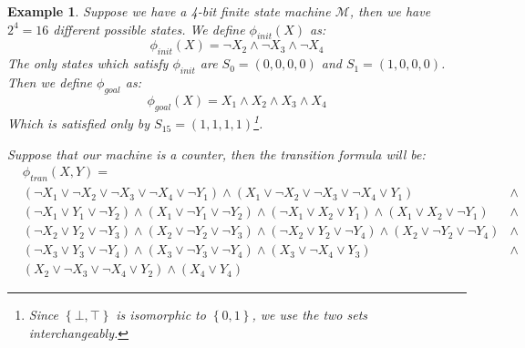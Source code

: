\documentclass{article}
\theoremstyle{example}
\newtheorem{example}{Example}
\theoremstyle{remark}
\begin{document}
\begin{example}
	Suppose we have a 4-bit finite state machine \(\mathcal{M}\), then we have \(2^4 = 16\) different
	possible states.
	We define \(\phi_{init}(X)\) as:
	\[\phi_{init}\left(X\right) = \neg X_2 \land \neg X_3 \land \neg X_4 \]
	The only states which satisfy \(\phi_{init}\) are \(S_0 = \left(0, 0, 0, 0\right)\) and
	\(S_1 = \left(1, 0, 0, 0\right)\).
	Then we define \(\phi_{goal}\) as:
	\[\phi_{goal}\left(X\right) = X_1 \land X_2 \land X_3 \land X_4\]
	Which is satisfied only by \(S_{15} = \left(1, 1, 1, 1\right)\)\footnote{Since
		\(\left\{\bot, \top\right\} \) is isomorphic to \(\left\{0, 1\right\} \), we use the two sets
		interchangeably.}.

	Suppose that our machine is a counter, then the transition formula will be:
	\begin{align*}
		& \phi_{tran}\left(X,Y\right) =                                                      \\
		& \left(\neg X_1 \lor \neg X_2 \lor \neg X_3 \lor \neg X_4 \lor \neg Y_1\right) \land
		\left(X_1 \lor \neg X_2 \lor \neg X_3 \lor \neg X_4 \lor Y_1\right) & \land						\\
		& \left(\neg X_1 \lor Y_1 \lor \neg Y_2\right) \land 
		\left(X_1 \lor \neg Y_1 \lor \neg Y_2\right) \land
		\left(\neg X_1 \lor X_2 \lor Y_1\right) \land
		\left(X_1 \lor X_2 \lor \neg Y_1\right)                             & \land						\\
		& \left(\neg X_2 \lor Y_2 \lor \neg Y_3\right) \land
		\left(X_2 \lor \neg Y_2 \lor \neg Y_3\right) \land
		\left(\neg X_2 \lor Y_2 \lor \neg Y_4\right) \land
		\left(X_2 \lor \neg Y_2 \lor \neg Y_4\right)                        & \land						\\
		& \left(\neg X_3 \lor Y_3 \lor \neg Y_4\right) \land
		\left(X_3 \lor \neg Y_3 \lor \neg Y_4\right) \land
		\left(X_3 \lor \neg X_4 \lor Y_3\right)                             & \land						\\
		& \left(X_2 \lor \neg X_3 \lor \neg X_4 \lor Y_2\right) \land
		\left(X_4 \lor Y_4\right)
	\end{align*}


\end{example}
\end{document}
